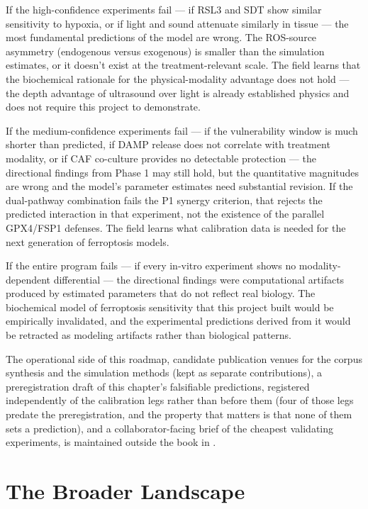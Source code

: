 \documentclass[11pt,twoside,openright]{report}
\begin{document}
If the high-confidence experiments fail --- if RSL3 and SDT show similar sensitivity to hypoxia, or if light and sound attenuate similarly in tissue --- the most fundamental predictions of the model are wrong. The ROS-source asymmetry (endogenous versus exogenous) is smaller than the simulation estimates, or it doesn't exist at the treatment-relevant scale. The field learns that the biochemical rationale for the physical-modality advantage does not hold --- the depth advantage of ultrasound over light is already established physics and does not require this project to demonstrate.

If the medium-confidence experiments fail --- if the vulnerability window is much shorter than predicted, if DAMP release does not correlate with treatment modality, or if CAF co-culture provides no detectable protection --- the directional findings from Phase 1 may still hold, but the quantitative magnitudes are wrong and the model's parameter estimates need substantial revision. If the dual-pathway combination fails the P1 synergy criterion, that rejects the predicted interaction in that experiment, not the existence of the parallel GPX4/FSP1 defenses. The field learns what calibration data is needed for the next generation of ferroptosis models.

If the entire program fails --- if every in-vitro experiment shows no modality-dependent differential --- the directional findings were computational artifacts produced by estimated parameters that do not reflect real biology. The biochemical model of ferroptosis sensitivity that this project built would be empirically invalidated, and the experimental predictions derived from it would be retracted as modeling artifacts rather than biological patterns.

The operational side of this roadmap, candidate publication venues for the corpus synthesis and the simulation methods (kept as separate contributions), a preregistration draft of this chapter's falsifiable predictions, registered independently of the calibration legs rather than before them (four of those legs predate the preregistration, and the property that matters is that none of them sets a prediction), and a collaborator-facing brief of the cheapest validating experiments, is maintained outside the book in .
\dinkus
{}
\chapter{The Broader Landscape}
\end{document}

